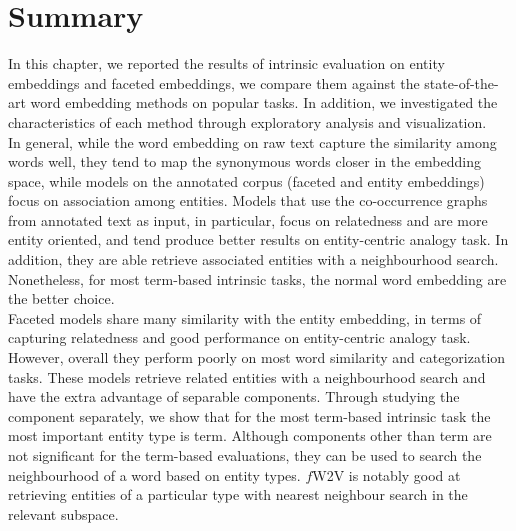 \section{Summary}\label{sec:eval_summary}
In this chapter, we reported the results of intrinsic evaluation on entity embeddings and faceted embeddings, we compare them against the state-of-the-art word embedding methods on popular tasks. In addition, we investigated the characteristics of each method through exploratory analysis and visualization.\\
In general, while the word embedding on raw text capture the similarity among words well, they tend to map the synonymous words closer in the embedding space, while models on the annotated corpus (faceted and entity embeddings) focus on association among entities. Models that use the co-occurrence graphs from annotated text as input, in particular, focus on relatedness and are more entity oriented, and tend produce better results on entity-centric analogy task. In addition, they are able retrieve associated entities with a neighbourhood search. Nonetheless, for most term-based intrinsic tasks, the normal word embedding are the better choice.\\
Faceted models share many similarity with the entity embedding, in terms of capturing relatedness and good performance on entity-centric analogy task. However, overall they perform poorly on most word similarity and categorization tasks. These models retrieve related entities with a neighbourhood search and have the extra advantage of separable components. Through studying the component separately, we show that for the most term-based intrinsic task the most important entity type is term. Although components other than term are not significant for the term-based  evaluations, they can be used to search the neighbourhood of a word based on entity types. $f$W2V is notably good at retrieving entities of a particular type with nearest neighbour search in the relevant subspace.
%
%
